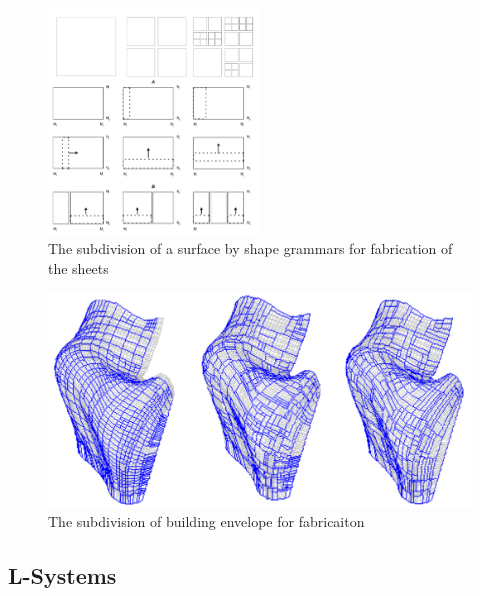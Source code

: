 \begin{figure}[htbp]
\centering
\includegraphics[width=0.5\textwidth]{./Images/13-SubdivisionRule}
\caption[Shape Grammar Subdivision]{The subdivision of a surface by shape grammars for fabrication of the sheets \cite{shelden02}}
\label{SubdivisionSG}
\end{figure}

\begin{figure}[htbp]
\centering
\includegraphics[width=\textwidth]{./Images/14-SurfaceFabrication}
\caption[Fabrication Surface Subdivision]{The subdivision of building envelope for fabricaiton \cite{shelden02}}
\label{SubdFab}
\end{figure}

\subsection{L-Systems}

